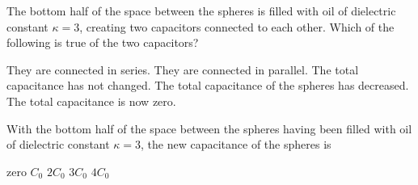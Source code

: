 \documentclass{../../../oss-apphys-exam}
\begin{document}
\begin{multicols*}{2}
\begin{questions}
   \question The bottom half of the space between the spheres is filled with
   oil of dielectric constant $\kappa=3$, creating two capacitors connected to
   each other. Which of the following is true of the two capacitors?
    \begin{center}
    \end{center}
    \begin{choices}
      \choice They are connected in series.
      \choice They are connected in parallel.
      \choice The total capacitance has not changed.
      \choice The total capacitance of the spheres has decreased.
      \choice The total capacitance is now zero.
    \end{choices}
    
    \question With the bottom half of the space between the spheres having been
    filled with oil of dielectric constant $\kappa=3$, the new capacitance of
    the spheres is
    \label{cap2}
    \begin{choices}
      \choice zero
      \choice $C_0$
      \choice $2C_0$
      \choice $3C_0$
      \choice $4C_0$
    \end{choices}   
  \end{questions}
\end{multicols*}
\newpage


\genfreedirections
\end{document}
